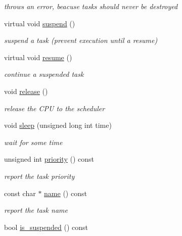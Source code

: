 \begin{DoxyCompactItemize}
\begin{DoxyCompactList}\small\item\em throws an error, beacuse tasks should never be destroyed \end{DoxyCompactList}\item 
virtual void \hyperlink{classrtos_1_1task__base_a23f6f33e6e2f3dbe35583c4eb2efe5f8}{suspend} ()
\begin{DoxyCompactList}\small\item\em suspend a task (prevent execution until a resume) \end{DoxyCompactList}\item 
virtual void \hyperlink{classrtos_1_1task__base_a3df0d70b06874044937c1ee59820c282}{resume} ()
\begin{DoxyCompactList}\small\item\em continue a suspended task \end{DoxyCompactList}\item 
void \hyperlink{classrtos_1_1task__base_a19952faefc023f605016ff19c46e9124}{release} ()
\begin{DoxyCompactList}\small\item\em release the C\+PU to the scheduler \end{DoxyCompactList}\item 
void \hyperlink{classrtos_1_1task__base_a16101726a2ed9744face297f9373b632}{sleep} (unsigned long int time)
\begin{DoxyCompactList}\small\item\em wait for some time \end{DoxyCompactList}\item 
unsigned int \hyperlink{classrtos_1_1task__base_a7c9b75a929b0d2ccceb440d6d9e5ba6a}{priority} () const \hypertarget{classrtos_1_1task__base_a7c9b75a929b0d2ccceb440d6d9e5ba6a}{}\label{classrtos_1_1task__base_a7c9b75a929b0d2ccceb440d6d9e5ba6a}

\begin{DoxyCompactList}\small\item\em report the task priority \end{DoxyCompactList}\item 
const char $\ast$ \hyperlink{classrtos_1_1task__base_a95a8550c6b1befe7ec8884b58fc818ee}{name} () const \hypertarget{classrtos_1_1task__base_a95a8550c6b1befe7ec8884b58fc818ee}{}\label{classrtos_1_1task__base_a95a8550c6b1befe7ec8884b58fc818ee}

\begin{DoxyCompactList}\small\item\em report the task name \end{DoxyCompactList}\item 
bool \hyperlink{classrtos_1_1task__base_ac544c2dd8eca5fb294213b7a9ad8779b}{is\+\_\+suspended} () const \hypertarget{classrtos_1_1task__base_ac544c2dd8eca5fb294213b7a9ad8779b}{}\label{classrtos_1_1task__base_ac544c2dd8eca5fb294213b7a9ad8779b}


\end{DoxyCompactItemize}
